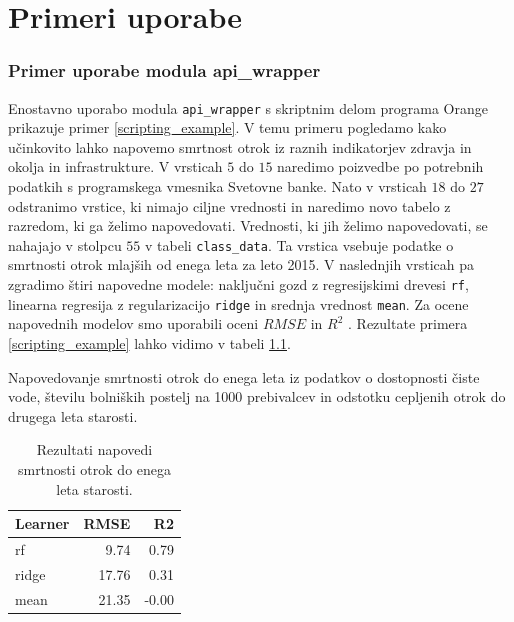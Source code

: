 \chapter{Primeri uporabe}


\subsection{Primer uporabe modula api\_wrapper}

Enostavno uporabo modula \verb|api_wrapper| s skriptnim delom programa Orange
prikazuje primer \ref{scripting_example}. V temu primeru pogledamo kako
učinkovito lahko napovemo smrtnost otrok iz raznih indikatorjev zdravja in
okolja in infrastrukture. V vrsticah $5$ do $15$ naredimo poizvedbe po
potrebnih podatkih s programskega vmesnika Svetovne banke. Nato v vrsticah $18$
do $27$ odstranimo vrstice, ki nimajo ciljne vrednosti in naredimo novo tabelo z
razredom, ki ga želimo napovedovati. Vrednosti, ki jih želimo napovedovati, se
nahajajo v stolpcu $55$ v tabeli \verb|class_data|. Ta vrstica vsebuje podatke
o smrtnosti otrok mlajših od enega leta za leto 2015. V naslednjih vrsticah
pa zgradimo štiri napovedne modele: naključni gozd z
regresijskimi drevesi \verb|rf|, linearna regresija z regularizacijo 
\verb|ridge| in srednja vrednost \verb|mean|.
Za ocene napovednih modelov smo uporabili oceni
$RMSE$  in 
$R^2$ .
Rezultate primera \ref{scripting_example} lahko vidimo v tabeli 
\ref{rezultati_skripte}.


\begin{snippet}
\begin{center}

\end{center}
\cprotect
\caption{Napovedovanje smrtnosti otrok do enega leta iz podatkov o dostopnosti
  čiste vode, številu bolniških postelj na 1000 prebivalcev in odstotku
  cepljenih otrok do drugega leta starosti.}
\label{scripting_example}
\end{snippet} 

\begin{table}
\begin{center}

\begin{tabular}{l|r|r}
  Learner & RMSE & R2 \\ \hline
  rf & 9.74 & 0.79 \\
  ridge & 17.76 & 0.31 \\
  mean & 21.35 & -0.00
\end{tabular}
\end{center}
\cprotect
\caption{Rezultati napovedi smrtnosti otrok do enega leta starosti.}
\label{rezultati_skripte}
\end{table} 



